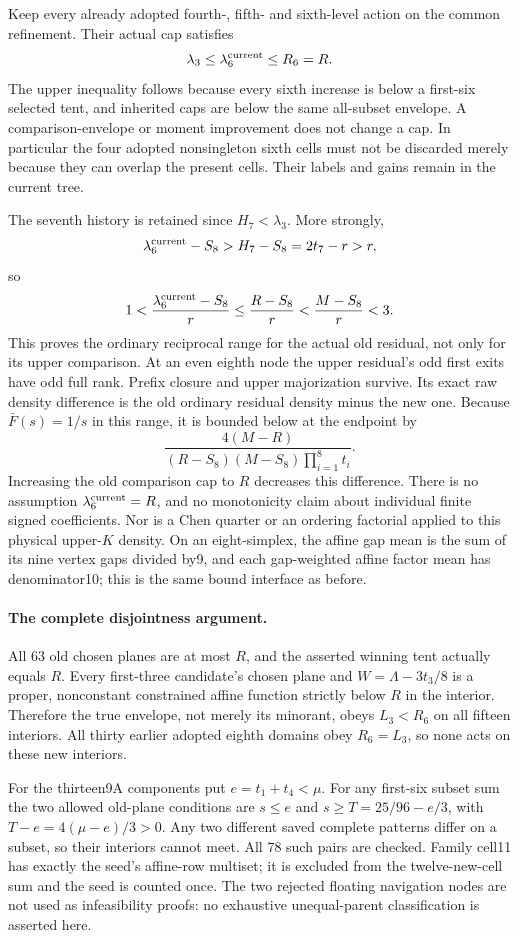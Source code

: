 Keep every already adopted fourth-, fifth- and sixth-level action on
the common refinement. Their actual cap satisfies
\[
 \lambda_3\le\lambda_6^{\rm current}\le R_6=R.
\]
The upper inequality follows because every sixth increase is below
a first-six selected tent, and inherited caps are below the same
all-subset envelope. A comparison-envelope or moment improvement
does not change a cap. In particular the four adopted nonsingleton
sixth cells must not be discarded merely because they can overlap
the present cells. Their labels and gains remain in the current tree.

The seventh history is retained since $H_7<\lambda_3$. More strongly,
\[
 \lambda_6^{\rm current}-S_8>H_7-S_8=2t_7-r>r,
\]
so
\[
 1<\frac{\lambda_6^{\rm current}-S_8}{r}
 \le\frac{R-S_8}{r}<\frac{M-S_8}{r}<3.
\]
This proves the ordinary reciprocal range for the actual old residual,
not only for its upper comparison. At an even eighth node the upper
residual's odd first exits have odd full rank. Prefix closure and upper
majorization survive. Its exact raw density difference is the old
ordinary residual density minus the new one. Because
$\bar F(s)=1/s$ in this range, it is bounded below at the endpoint by
\[
 \frac{4(M-R)}{(R-S_8)(M-S_8)\prod_{i=1}^8t_i}.
 \tag{J}
\]
Increasing the old comparison cap to $R$ decreases this difference.
There is no assumption $\lambda_6^{\rm current}=R$, and no monotonicity
claim about individual finite signed coefficients. Nor is a Chen
quarter or an ordering factorial applied to this physical upper-$K$
density. On an eight-simplex, the affine gap mean is the sum of its
nine vertex gaps divided by9, and each gap-weighted affine factor
mean has denominator10; this is the same bound interface as before.

\paragraph{The complete disjointness argument.}
All 63 old chosen planes are at most $R$, and the asserted winning
tent actually equals $R$. Every first-three candidate's chosen plane
and $W=\Lambda-3t_3/8$ is a proper, nonconstant constrained affine
function strictly below $R$ in the interior. Therefore the true
envelope, not merely its minorant, obeys
$L_3<R_6$ on all fifteen interiors. All thirty earlier adopted eighth
domains obey $R_6=L_3$, so none acts on these new interiors.

For the thirteen9A components put $e=t_1+t_4<\mu$.
For any first-six subset sum the two allowed old-plane conditions are
$s\le e$ and $s\ge T=25/96-e/3$, with
$T-e=4(\mu-e)/3>0$. Any two different saved complete patterns differ
on a subset, so their interiors cannot meet. All 78 such pairs are
checked. Family cell11 has exactly the seed's affine-row multiset;
it is excluded from the twelve-new-cell sum and the seed is counted
once. The two rejected floating navigation nodes are not used as
infeasibility proofs: no exhaustive unequal-parent classification
is asserted here.

